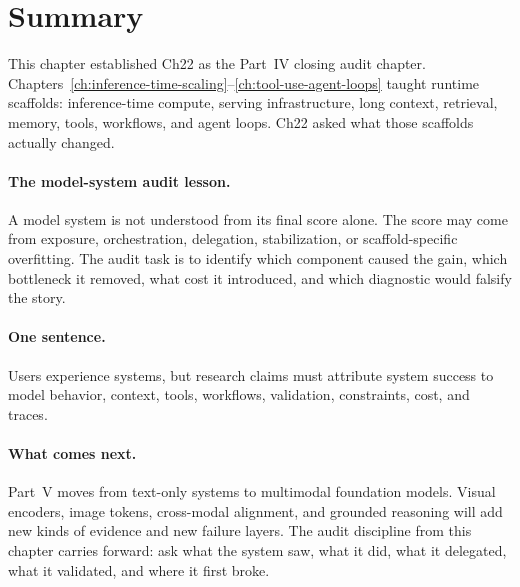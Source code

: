 \section*{Summary}
\label{sec:ch22-summary}

This chapter established Ch22 as the Part~IV closing audit chapter. Chapters~\ref{ch:inference-time-scaling}--\ref{ch:tool-use-agent-loops} taught runtime scaffolds: inference-time compute, serving infrastructure, long context, retrieval, memory, tools, workflows, and agent loops. Ch22 asked what those scaffolds actually changed.

\paragraph{The model-system audit lesson.} A model system is not understood from its final score alone. The score may come from exposure, orchestration, delegation, stabilization, or scaffold-specific overfitting. The audit task is to identify which component caused the gain, which bottleneck it removed, what cost it introduced, and which diagnostic would falsify the story.

\paragraph{One sentence.} Users experience systems, but research claims must attribute system success to model behavior, context, tools, workflows, validation, constraints, cost, and traces.

\paragraph{What comes next.} Part~V moves from text-only systems to multimodal foundation models. Visual encoders, image tokens, cross-modal alignment, and grounded reasoning will add new kinds of evidence and new failure layers. The audit discipline from this chapter carries forward: ask what the system saw, what it did, what it delegated, what it validated, and where it first broke.

